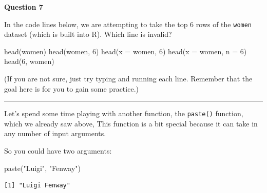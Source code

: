 \documentclass[
  letterpaper,
  DIV=11,
  numbers=noendperiod]{scrreprt}
\newenvironment{Shaded}{\begin{snugshade}}{\end{snugshade}}
\newcommand{\AttributeTok}[1]{\textcolor[rgb]{0.40,0.45,0.13}{#1}}
\newcommand{\DecValTok}[1]{\textcolor[rgb]{0.68,0.00,0.00}{#1}}
\newcommand{\FunctionTok}[1]{\textcolor[rgb]{0.28,0.35,0.67}{#1}}
\newcommand{\NormalTok}[1]{\textcolor[rgb]{0.00,0.23,0.31}{#1}}
\newcommand{\StringTok}[1]{\textcolor[rgb]{0.13,0.47,0.30}{#1}}
\begin{document}
\begin{tcolorbox}[enhanced jigsaw, titlerule=0mm, colback=white, left=2mm, breakable, opacitybacktitle=0.6, colbacktitle=quarto-callout-tip-color!10!white, colframe=quarto-callout-tip-color-frame, bottomtitle=1mm, opacityback=0, coltitle=black, arc=.35mm, toptitle=1mm, title=\textcolor{quarto-callout-tip-color}{\faLightbulb}\hspace{0.5em}{Practice}, leftrule=.75mm, toprule=.15mm, bottomrule=.15mm, rightrule=.15mm]

\textbf{Question 7}

In the code lines below, we are attempting to take the top 6 rows of the
\texttt{women} dataset (which is built into R). Which line is invalid?

\begin{Shaded}
\begin{Highlighting}[]
\FunctionTok{head}\NormalTok{(women)}
\FunctionTok{head}\NormalTok{(women, }\DecValTok{6}\NormalTok{)}
\FunctionTok{head}\NormalTok{(}\AttributeTok{x =}\NormalTok{ women, }\DecValTok{6}\NormalTok{)}
\FunctionTok{head}\NormalTok{(}\AttributeTok{x =}\NormalTok{ women, }\AttributeTok{n =} \DecValTok{6}\NormalTok{)}
\FunctionTok{head}\NormalTok{(}\DecValTok{6}\NormalTok{, women)}
\end{Highlighting}
\end{Shaded}

(If you are not sure, just try typing and running each line. Remember
that the goal here is for you to gain some practice.)

\end{tcolorbox}

\begin{center}\rule{0.5\linewidth}{0.5pt}\end{center}

Let's spend some time playing with another function, the
\texttt{paste()} function, which we already saw above, This function is
a bit special because it can take in any number of input arguments.

So you could have two arguments:

\begin{Shaded}
\begin{Highlighting}[]
\FunctionTok{paste}\NormalTok{(}\StringTok{"Luigi"}\NormalTok{, }\StringTok{"Fenway"}\NormalTok{)}
\end{Highlighting}
\end{Shaded}

\begin{verbatim}
[1] "Luigi Fenway"
\end{verbatim}
\end{document}
